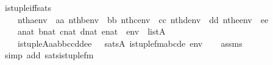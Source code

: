 \begin{isabellebody}
\ is{\isacharunderscore}{\kern0pt}tuple{\isacharunderscore}{\kern0pt}iff{\isacharunderscore}{\kern0pt}sats{\isacharcolon}{\kern0pt}\isanewline
\ \ \isanewline
\ \ \ \ {\isachardoublequoteopen}nth{\isacharparenleft}{\kern0pt}a{\isacharcomma}{\kern0pt}env{\isacharparenright}{\kern0pt}\ {\isacharequal}{\kern0pt}\ aa{\isachardoublequoteclose}\ {\isachardoublequoteopen}nth{\isacharparenleft}{\kern0pt}b{\isacharcomma}{\kern0pt}env{\isacharparenright}{\kern0pt}\ {\isacharequal}{\kern0pt}\ bb{\isachardoublequoteclose}\ {\isachardoublequoteopen}nth{\isacharparenleft}{\kern0pt}c{\isacharcomma}{\kern0pt}env{\isacharparenright}{\kern0pt}\ {\isacharequal}{\kern0pt}\ cc{\isachardoublequoteclose}\ {\isachardoublequoteopen}nth{\isacharparenleft}{\kern0pt}d{\isacharcomma}{\kern0pt}env{\isacharparenright}{\kern0pt}\ {\isacharequal}{\kern0pt}\ dd{\isachardoublequoteclose}\ {\isachardoublequoteopen}nth{\isacharparenleft}{\kern0pt}e{\isacharcomma}{\kern0pt}env{\isacharparenright}{\kern0pt}\ {\isacharequal}{\kern0pt}\ ee{\isachardoublequoteclose}\isanewline
\ \ \ \ {\isachardoublequoteopen}a{\isasymin}nat{\isachardoublequoteclose}\ {\isachardoublequoteopen}b{\isasymin}nat{\isachardoublequoteclose}\ {\isachardoublequoteopen}c{\isasymin}nat{\isachardoublequoteclose}\ {\isachardoublequoteopen}d{\isasymin}nat{\isachardoublequoteclose}\ {\isachardoublequoteopen}e{\isasymin}nat{\isachardoublequoteclose}\ \ {\isachardoublequoteopen}env\ {\isasymin}\ list{\isacharparenleft}{\kern0pt}A{\isacharparenright}{\kern0pt}{\isachardoublequoteclose}\isanewline
\ \ \isanewline
\ \ \ \ {\isachardoublequoteopen}is{\isacharunderscore}{\kern0pt}tuple{\isacharparenleft}{\kern0pt}{\isacharhash}{\kern0pt}{\isacharhash}{\kern0pt}A{\isacharcomma}{\kern0pt}aa{\isacharcomma}{\kern0pt}bb{\isacharcomma}{\kern0pt}cc{\isacharcomma}{\kern0pt}dd{\isacharcomma}{\kern0pt}ee{\isacharparenright}{\kern0pt}\ \ {\isasymlongleftrightarrow}\ sats{\isacharparenleft}{\kern0pt}A{\isacharcomma}{\kern0pt}\ is{\isacharunderscore}{\kern0pt}tuple{\isacharunderscore}{\kern0pt}fm{\isacharparenleft}{\kern0pt}a{\isacharcomma}{\kern0pt}b{\isacharcomma}{\kern0pt}c{\isacharcomma}{\kern0pt}d{\isacharcomma}{\kern0pt}e{\isacharparenright}{\kern0pt}{\isacharcomma}{\kern0pt}\ env{\isacharparenright}{\kern0pt}{\isachardoublequoteclose}\isanewline
%
\isadelimproof
\ \ %
\endisadelimproof
%
\isatagproof
{}\isamarkupfalse%
\ assms\ \isamarkupfalse%
\ {\isacharparenleft}{\kern0pt}simp\ add{\isacharcolon}{\kern0pt}\ sats{\isacharunderscore}{\kern0pt}is{\isacharunderscore}{\kern0pt}tuple{\isacharunderscore}{\kern0pt}fm{\isacharparenright}{\kern0pt}%

\end{isabellebody}
